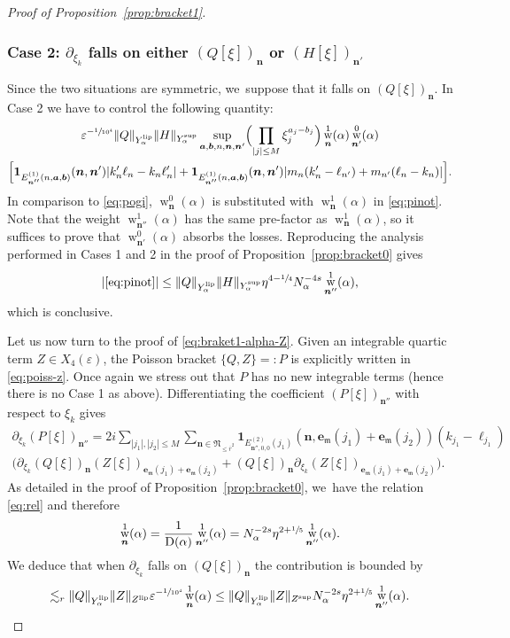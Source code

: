\documentclass[JEP,XML,SOM,Unicode,published]{cedram}
\DeclareMathOperator{\rw}{w}
\theoremstyle{plain}
\theoremstyle{definition}
\newcommand{\nb}{{\boldsymbol n}}
\newcommand{\Nb}{{\boldsymbol{\mathfrak{N}}}}
\newcommand{\1}{\mathbf{1}}
\newcommand{\Ysup}[1]{Y_{#1}^{\mathrm{sup}}}
\newcommand{\Ylip}[1]{Y_{#1}^{\mathrm{lip}}}
\let\epsilon\varepsilon
\begin{document}
\begin{proof}[Proof of Proposition~\ref{prop:bracket1}]
\subsubsection*{Case 2: $\partial_{\xi_{k}}$ falls on either $(Q[\xi])_{\nb}$ or $(H[\xi])_{\nb'}$}
Since the two situations are symmetric, we~suppose that it falls on $(Q[\xi])_{\nb}$. In Case 2 we have to control the following quantity:
\begin{multline}
\epsilon^{-\sfrac{1}{10^{4}}}
\|Q\|_{\Ylip{\alpha}}\|H\|_{\Ysup{\alpha}}
\sup_{\boldsymbol{a},\boldsymbol{b},n,\nb,\nb'}
\Bigl(\prod_{|j|\leq M}\xi_{j}^{a_{j}-b_{j}}\Bigr)\rw_{\nb}^{1}(\alpha)\rw_{\nb'}^{0}(\alpha) \\
\Big[\mathbf{1}_{E_{\nb''}^{(1)}(n,\boldsymbol{a},\boldsymbol{b})}(\nb,\nb')
|k_{n}'\ell_{n}-k_{n}\ell_{n}'|
+\mathbf{1}_{E_{\nb''}^{(1)}(n,\boldsymbol{a},\boldsymbol{b})}(\nb,\nb')
|m_{n}(k_{n}'-\ell_{n'})+m_{n'}(\ell_{n}-k_{n})|
\Big].
\label{eq:pinot}
\end{multline}
In comparison to \eqref{eq:pogi}, $\rw_{\nb}^{0}(\alpha)$ is substituted with $\rw_{\nb}^{1}(\alpha)$ in \eqref{eq:pinot}. Note that the weight $\rw_{\nb''}^{1}(\alpha)$ has the same pre-factor as $\rw_{\nb}^{1}(\alpha)$, so it suffices to prove that $\rw_{\nb'}^{0}(\alpha)$ absorbs the losses. Reproducing the analysis performed in Cases 1 and 2 in the proof of Proposition~\ref{prop:bracket0} gives
\[
|\eqref{eq:pinot}| \leq
\|Q\|_{\Ylip{\alpha}}\|H\|_{\Ysup{\alpha}}\eta^{4-\sfrac{1}{4}}N_{\alpha}^{-4s}\rw_{\nb''}^{1}(\alpha),
\]
which is conclusive.

Let us now turn to the proof of \eqref{eq:braket1-alpha-Z}. Given an integrable quartic term $Z\in X_{4}(\epsilon)$, the Poisson bracket $\{Q,Z\}=:P$ is explicitly written in \eqref{eq:poiss-z}. Once again we stress out that $P$ has no new integrable terms (hence there is no Case 1 as above). Differentiating the coefficient $(P[\xi])_{\nb''}$ with respect to $\xi_{k}$ gives
\begin{multline}
\label{eq:midi}
\partial_{\xi_{k}}(P[\xi])_{\nb''}
= 2i\sum_{|j_{1}|,|j_{2}|\leq M}
\sum_{\nb\in\Nb_{\leq\overline{r}^{2}}}
\mathbf{1}
_{E_{\nb'',0,0}^{(2)}(j_{1})}
(
\nb,
\boldsymbol{e}_{\mathfrak{m}}(j_{1})+\boldsymbol{e}_{\mathfrak{m}}(j_{2})
)
(k_{j_{1}}-\ell_{j_{1}}) \\
\Big(
\partial_{\xi_{k}}(Q[\xi])_{\nb}
(Z[\xi])_{\boldsymbol{e}_{\mathfrak{m}}(j_{1})+\boldsymbol{e}_{\mathfrak{m}}(j_{2})}
+
(Q[\xi])_{\nb}
\partial_{\xi_{k}}
(Z[\xi])_{\boldsymbol{e}_{\mathfrak{m}}(j_{1})+\boldsymbol{e}_{\mathfrak{m}}(j_{2})}
\Big).
\end{multline}
As detailed in the proof of Proposition~\ref{prop:bracket0}, we~have the relation \eqref{eq:rel} and therefore
\[
\rw_{\nb}^{1}(\alpha) = \frac{1}{\operatorname{D}(\alpha)}\rw_{\nb''}^{1}(\alpha) = N_{\alpha}^{-2s}\eta^{2+\sfrac{1}{5}}\rw_{\nb''}^{1}(\alpha).
\]
We deduce that when $\partial_{\xi_{k}}$ falls on $(Q[\xi])_{\nb}$ the contribution is bounded by
\[
\lesssim_{r}
\|Q\|_{\Ylip{\alpha}}\|Z\|_{Z^{\mathrm{lip}}}
\epsilon^{-\sfrac{1}{10^{4}}}
\rw_{\nb}^{1}(\alpha)
\leq
\|Q\|_{\Ylip{\alpha}}\|Z\|_{Z^{\mathrm{sup}}}
N_{\alpha}^{-2s}\eta^{2+\sfrac{1}{5}}
\rw_{\nb''}^{1}(\alpha).
\]


\end{proof}
\end{document}
